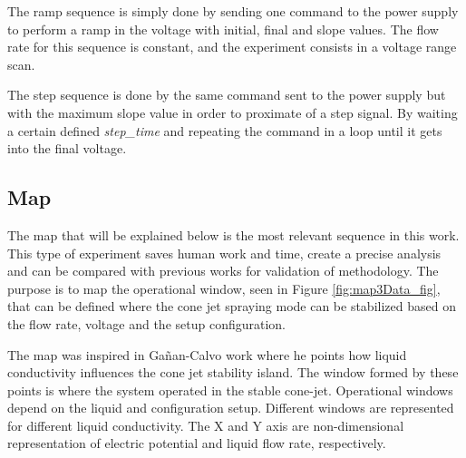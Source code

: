 The ramp sequence is simply done by sending one command to the power supply to perform a ramp in the voltage with initial, final and slope values.
The flow rate for this sequence is constant, and the experiment consists in a voltage range scan.

The step sequence is done by the same command sent to the power supply but with the maximum slope value in order to proximate of a step signal.
By waiting a certain defined \emph{step\_time} and repeating the command in a loop until it gets into the final voltage.



\subsection{Map}

The map that will be explained below is the most relevant sequence in this work. This type of experiment saves human work and time, create a precise analysis and can be compared with previous works for validation of methodology.
The purpose is to map the operational window, seen in Figure \ref{fig:map3Data_fig}, that can be defined where the cone jet spraying mode can be stabilized based on the flow rate, voltage and the setup configuration.

The map was inspired in Gañan-Calvo\cite{gananCalvo} work where he points how liquid conductivity influences the cone jet stability island. 
The window formed by these points is where the system operated in the stable cone-jet. Operational windows depend on the liquid and configuration setup. Different windows are represented for different liquid conductivity. The X and Y axis are non-dimensional representation of electric potential and liquid flow rate, respectively.

